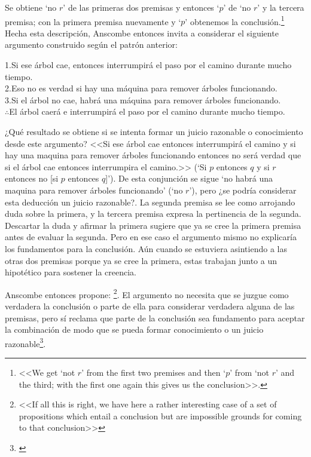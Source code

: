   Se obtiene `no $r$' de las primeras dos premisas y entonces `$p$' de `no $r$'
  y la tercera premisa; con la primera premisa nuevamente y `$p$' obtenemos la
  conclusión.{\footnote{\cite[299]{anscombe2015logic:qpa} <<We get `not $r$'
      from the first two premises and then `$p$' from `not $r$' and the third;
      with the first one again this gives us the conclusion>>.}} Hecha esta
  descripción, Anscombe entonces invita a considerar el siguiente argumento
  construido según el patrón anterior:
  \begin{adjustwidth}{1.2cm}{}
    1.\hspace{.459cm}Si ese árbol cae, entonces interrumpirá el paso por el camino
    durante mucho tiempo.\\
    2.\hspace{.459cm}Eso no es verdad si hay una máquina para remover árboles
    funcionando.\\
    3.\hspace{.459cm}Si el árbol no cae, habrá una máquina para remover árboles
    funcionando.\\
    $\therefore$\hspace{.459cm}El árbol caerá e interrumpirá el paso por el camino
    durante mucho tiempo.
  \end{adjustwidth}

  ¿Qué resultado se obtiene si se intenta formar un juicio razonable o
  conocimiento desde este argumento? <<Si ese árbol cae entonces interrumpirá el
  camino y si hay una maquina para remover árboles funcionando entonces no será
  verdad que si el árbol cae entonces interrumpira el camino.>> (`Si $p$
  entonces $q$ y si $r$ entonces no [si $p$ entonces $q$]'). De esta conjunción
  se sigue `no habrá una maquina para remover árboles funcionando' (`no $r$'),
  pero ¿se podría considerar esta deducción un juicio razonable?. La segunda
  premisa se lee como arrojando duda sobre la primera, y la tercera premisa
  expresa la pertinencia de la segunda. Descartar la duda y afirmar la primera
  sugiere que ya se cree la primera premisa antes de evaluar la segunda. Pero en
  ese caso el argumento mismo no explicaría los fundamentos para la conclusión.
  Aún cuando se estuviera asintiendo a las otras dos premisas porque ya se cree
  la primera, estas trabajan junto a un hipotético para sostener la
  creencia\autocite[Cf.~][300]{anscombe2015logic:qpa}.

  Anscombe entonces propone: \footnote{\cite[300]{anscombe2015logic:qpa} <<If all this is
    right, we have here a rather interesting case of a set of propositions which
    entail a conclusion but are impossible grounds for coming to that
    conclusion>>}. El argumento no necesita que se juzgue como verdadera la
  conclusión o parte de ella para considerar verdadera alguna de las premisas,
  pero sí reclama que parte de la conclusión sea fundamento para aceptar la
  combinación de modo que se pueda formar conocimiento o un juicio
  razonable\footnote{\cite[Cf.~][301]{anscombe2015logic:qpa}}.


